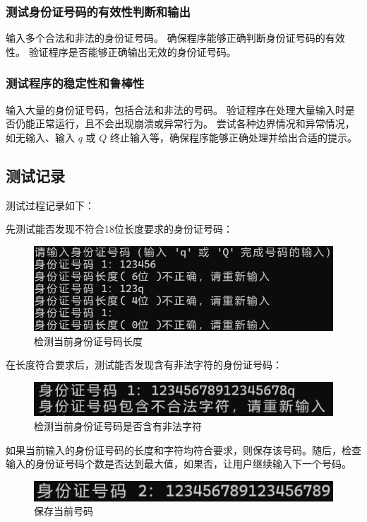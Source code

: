 \documentclass[withoutpreface,bwprint]{cumcmthesis}  %
\begin{document}
		
		\subsubsection{测试身份证号码的有效性判断和输出}  
		输入多个合法和非法的身份证号码。
		确保程序能够正确判断身份证号码的有效性。
		验证程序是否能够正确输出无效的身份证号码。
		
		\subsubsection{测试程序的稳定性和鲁棒性}
		输入大量的身份证号码，包括合法和非法的号码。
		验证程序在处理大量输入时是否仍能正常运行，且不会出现崩溃或异常行为。
		尝试各种边界情况和异常情况，如无输入、输入 $q$ 或 $Q$  终止输入等，确保程序能够正确处理并给出合适的提示。
		
		\subsection{测试记录}
		测试过程记录如下：
		
		先测试能否发现不符合18位长度要求的身份证号码：
		\begin{figure}[ht]
			\centering
			\includegraphics[width=.8\textwidth]{长度.png}
			\caption{检测当前身份证号码长度}
		\end{figure}
		
		在长度符合要求后，测试能否发现含有非法字符的身份证号码：
		\begin{figure}[ht]
			\centering
			\includegraphics[width=.6\textwidth]{字符.png}
			\caption{检测当前身份证号码是否含有非法字符}
		\end{figure}
		
		如果当前输入的身份证号码的长度和字符均符合要求，则保存该号码。随后，检查输入的身份证号码个数是否达到最大值，如果否，让用户继续输入下一个号码。
		
		\begin{figure}[ht]
			\centering
			\includegraphics[width=.6\textwidth]{普通号码.png}
			\caption{保存当前号码}
		\end{figure}
		
\end{document}
